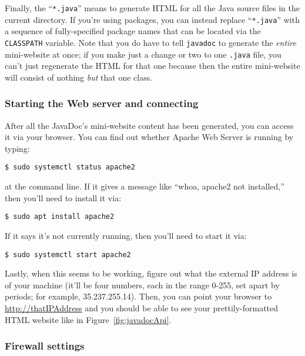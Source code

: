 Finally, the ``\texttt{*.java}'' means to generate HTML for all the Java source
files in the current directory. If you're using packages, you can instead
replace ``\texttt{*.java}'' with a sequence of fully-specified package names
that can be located via the \texttt{CLASSPATH} variable. Note that you
do have to tell \texttt{javadoc} to generate the \textit{entire} mini-website
at once; if you make just a change or two to one \texttt{.java} file, you
can't just regenerate the HTML for that one because then the entire
mini-website will consist of nothing \textit{but} that one class.

\subsubsection{Starting the Web server and connecting}

After all the JavaDoc's mini-website content has been generated, you can
access it via your browser. You can find out whether Apache Web Server is
running by typing:

\begin{Verbatim}[fontsize=\small,samepage=true,frame=none]
$ sudo systemctl status apache2
\end{Verbatim}

at the command line. If it gives a message like ``whoa, apache2 not
installed,'' then you'll need to install it via:

\begin{Verbatim}[fontsize=\small,samepage=true,frame=none]
$ sudo apt install apache2
\end{Verbatim}

If it says it's not currently running, then you'll need to start it via:

\begin{Verbatim}[fontsize=\small,samepage=true,frame=none]
$ sudo systemctl start apache2
\end{Verbatim}

Lastly, when this seems to be working, figure out what the external IP address
is of your machine (it'll be four numbers, each in the range 0-255, set apart
by periods; for example, 35.237.255.14). Then, you can point your browser to
\url{http://thatIPAddress} and you should be able to see your
prettily-formatted HTML website like in Figure~\ref{fig:javadocApi}.

\subsubsection{Firewall settings}

